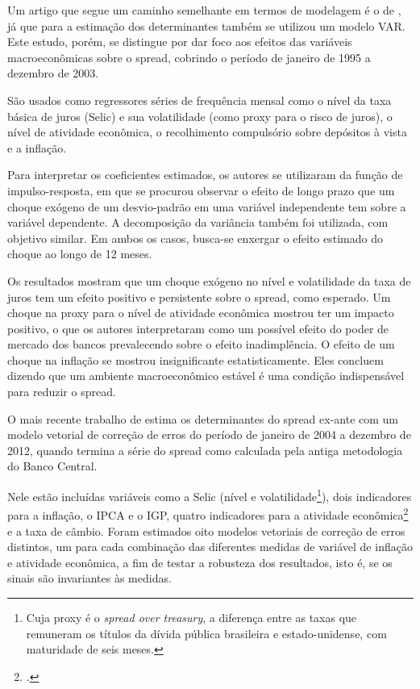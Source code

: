 \documentclass[a4paper,
               article,
               12pt,
               openany,
               oneside,
               english,
               brazil]{abntex2}
\numberwithin{equation}{section}
\begin{document}
    Um artigo que segue um caminho semelhante em termos de modelagem é o de \textcite{oreiro}, já que para a estimação dos determinantes também se utilizou um modelo VAR\@. Este estudo, porém, se distingue por dar foco aos efeitos das variáveis macroeconômicas sobre o spread, cobrindo o período de janeiro de 1995 a dezembro de 2003. 
    
    São usados como regressores séries de frequência mensal como o nível da taxa básica de juros (Selic) e sua volatilidade (como proxy para o risco de juros), o nível de atividade econômica, o recolhimento compulsório sobre depósitos à vista e a inflação.

    Para interpretar os coeficientes estimados, os autores se utilizaram da função de impulso-resposta, em que se procurou observar o efeito de longo prazo que um choque exógeno de um desvio-padrão em uma variável independente tem sobre a variável dependente. A decomposição da variância também foi utilizada, com objetivo similar. Em ambos os casos, busca-se enxergar o efeito estimado do choque ao longo de 12 meses.

    Os resultados mostram que um choque exógeno no nível e volatilidade da taxa de juros tem um efeito positivo e persistente sobre o spread, como esperado. Um choque na proxy para o nível de atividade econômica mostrou ter um impacto positivo, o que os autores interpretaram como um possível efeito do poder de mercado dos bancos prevalecendo sobre o efeito inadimplência. O efeito de um choque na inflação se mostrou insignificante estatisticamente. Eles concluem dizendo que um ambiente macroeconômico estável é uma condição indispensável para reduzir o spread.

    O mais recente trabalho de \textcite{chaim} estima os determinantes do spread ex-ante com um modelo vetorial de correção de erros do período de janeiro de 2004 a dezembro de 2012, quando termina a série do spread como calculada pela antiga metodologia do Banco Central.

    Nele estão incluídas variáveis como a Selic (nível e volatilidade\footnote{Cuja proxy é o \textit{spread over treasury}, a diferença entre as taxas que remuneram os títulos da dívida pública brasileira e estado-unidense, com maturidade de seis meses.}), dois indicadores para a inflação, o IPCA e o IGP, quatro indicadores para a atividade econômica\footcite[20]{chaim} e a taxa de câmbio. Foram estimados oito modelos vetoriais de correção de erros distintos, um para cada combinação das diferentes medidas de variável de inflação e atividade econômica, a fim de testar a robusteza dos resultados, isto é, se os sinais são invariantes às medidas. 
\end{document}
